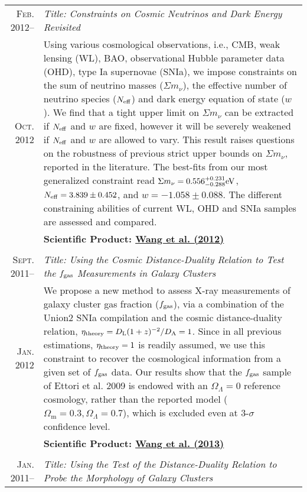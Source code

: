 \documentclass[10pt]{article}
\begin{document}
\begin{longtable}{r|p{17cm}}
  \textsc{Feb. 2012}--   &   \emph{Title: Constraints on Cosmic Neutrinos and Dark Energy Revisited}  \\
  \textsc{Oct. 2012}     &   \small{Using various cosmological observations, i.e., CMB, weak lensing (WL), BAO, observational Hubble
  parameter data (OHD), type Ia supernovae (SNIa), we impose constraints on the sum of neutrino masses ($\Sigma m_{\nu}$), the
  effective number of neutrino species ($N_{\rm eff}$) and dark energy equation of state ($w$). We find that a tight upper limit
  on $\Sigma m_{\nu}$ can be extracted if $N_{\rm eff}$ and $w$ are fixed, however it will be severely weakened if $N_{\rm eff}$ and
  $w$ are allowed to vary. This result raises questions on the robustness of previous strict upper bounds on $\Sigma m_{\nu}$,
  reported in the literature. The best-fits from our most generalized constraint read $\Sigma m_{\nu}=0.556^{+0.231}_{-0.288}\rm
  eV$, $N_{\rm eff}=3.839\pm0.452$, and $w=-1.058\pm0.088$. The different constraining abilities of current WL, OHD and SNIa samples 
  are assessed and compared.}\\
  &   \textbf{Scientific Product: \hyperlink{12.wang.jcap}{Wang et al. (2012)}}  \\
  \multicolumn{2}{c}{} \\
  \textsc{Sept. 2011}--  &   \emph{Title: Using the Cosmic Distance-Duality Relation to Test the $f_{\rm gas}$ Measurements in Galaxy Clusters} \\
  \textsc{Jan. 2012}     &   \small{We propose a new method to assess X-ray measurements of galaxy cluster gas fraction ($f_{\rm
  gas}$), via a combination of the Union2 SNIa compilation and the cosmic distance-duality relation, $\eta_{\rm{theory}}=D_{\rm
  L}(1+z)^{-2}/D_{\rm A}=1$. Since in all previous estimations, $\eta_{\rm{theory}}=1$ is readily assumed, we use this constraint to
  recover the cosmological information from a given set of $f_{\rm gas}$ data. Our results show that the $f_{\rm gas}$ sample of
  Ettori et al. 2009 is endowed with an $\Omega_{\Lambda}=0$ reference cosmology, rather than the reported model
  ($\Omega_\textrm{m}=0.3,\Omega_{\Lambda}=0.7$), which is excluded even at 3-$\sigma$ confidence level.}\\
  &   \textbf{Scientific Product: \hyperlink{13.wang.raa}{Wang et al. (2013)}}  \\
  \multicolumn{2}{c}{} \\
  \textsc{Jan. 2011}--   &   \emph{Title: Using the Test of the Distance-Duality Relation to Probe the Morphology of Galaxy Clusters} \\

\end{longtable}
\end{document}
